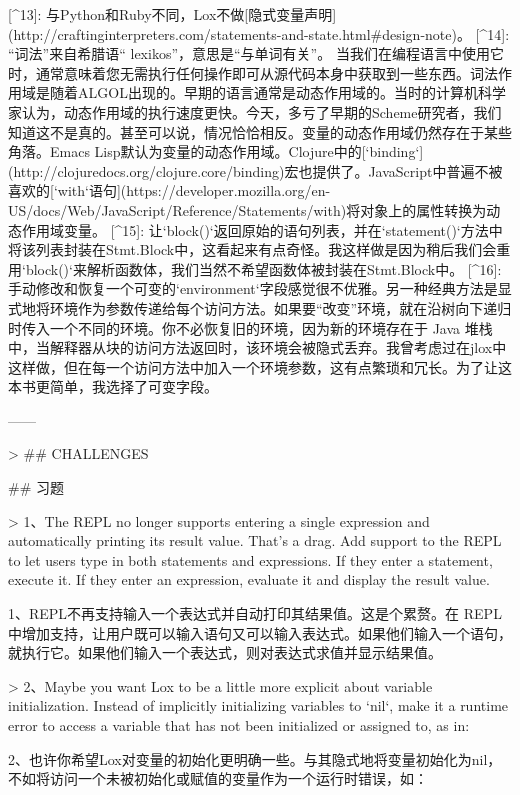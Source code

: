 \documentclass[cn,11pt,chinese]{elegantbook}
\begin{document}
{[^13]: 与Python和Ruby不同，Lox不做[隐式变量声明](http://craftinginterpreters.com/statements-and-state.html#design-note)。
[^14]: “词法”来自希腊语“ lexikos”，意思是“与单词有关”。 当我们在编程语言中使用它时，通常意味着您无需执行任何操作即可从源代码本身中获取到一些东西。词法作用域是随着ALGOL出现的。早期的语言通常是动态作用域的。当时的计算机科学家认为，动态作用域的执行速度更快。今天，多亏了早期的Scheme研究者，我们知道这不是真的。甚至可以说，情况恰恰相反。变量的动态作用域仍然存在于某些角落。Emacs Lisp默认为变量的动态作用域。Clojure中的[`binding`](http://clojuredocs.org/clojure.core/binding)宏也提供了。JavaScript中普遍不被喜欢的[`with`语句](https://developer.mozilla.org/en-US/docs/Web/JavaScript/Reference/Statements/with)将对象上的属性转换为动态作用域变量。
[^15]: 让`block()`返回原始的语句列表，并在`statement()`方法中将该列表封装在Stmt.Block中，这看起来有点奇怪。我这样做是因为稍后我们会重用`block()`来解析函数体，我们当然不希望函数体被封装在Stmt.Block中。
[^16]: 手动修改和恢复一个可变的`environment`字段感觉很不优雅。另一种经典方法是显式地将环境作为参数传递给每个访问方法。如果要“改变”环境，就在沿树向下递归时传入一个不同的环境。你不必恢复旧的环境，因为新的环境存在于 Java 堆栈中，当解释器从块的访问方法返回时，该环境会被隐式丢弃。我曾考虑过在jlox中这样做，但在每一个访问方法中加入一个环境参数，这有点繁琐和冗长。为了让这本书更简单，我选择了可变字段。



------

> ## CHALLENGES

## 习题

> 1、The REPL no longer supports entering a single expression and automatically printing its result value. That’s a drag. Add support to the REPL to let users type in both statements and expressions. If they enter a statement, execute it. If they enter an expression, evaluate it and display the result value.

1、REPL不再支持输入一个表达式并自动打印其结果值。这是个累赘。在 REPL 中增加支持，让用户既可以输入语句又可以输入表达式。如果他们输入一个语句，就执行它。如果他们输入一个表达式，则对表达式求值并显示结果值。

> 2、Maybe you want Lox to be a little more explicit about variable initialization. Instead of implicitly initializing variables to `nil`, make it a runtime error to access a variable that has not been initialized or assigned to, as in:

2、也许你希望Lox对变量的初始化更明确一些。与其隐式地将变量初始化为nil，不如将访问一个未被初始化或赋值的变量作为一个运行时错误，如：

}
\end{document}
